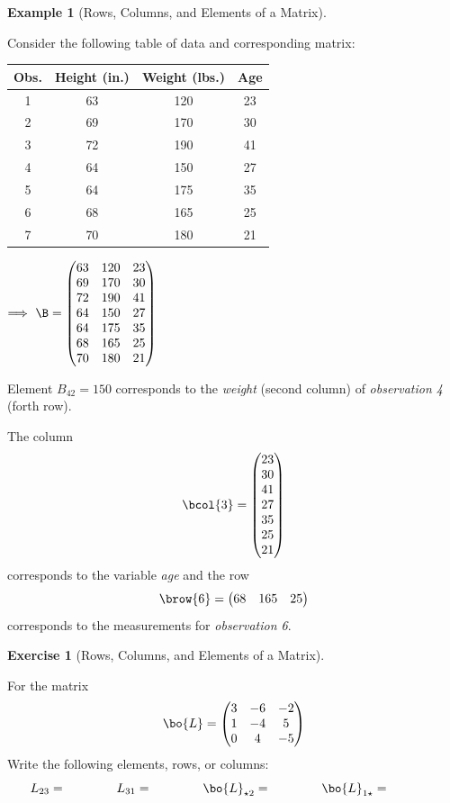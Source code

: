 \documentclass[
]{article}
\theoremstyle{definition}
\theoremstyle{definition}
\newtheorem{example}{Example}[section]
\theoremstyle{definition}
\newtheorem{exercise}{Exercise}[section]
\theoremstyle{definition}
\theoremstyle{remark}
\begin{document}
\begin{example}[Rows, Columns, and Elements of a Matrix]
\protect\hypertarget{exm:ijnot}{}\label{exm:ijnot}

Consider the following table of data and corresponding matrix:

\begin{center}
\begin{tabular}{c|c|c|c}
Obs. & Height (in.) & Weight (lbs.) & Age \\
\hline
1 & 63 & 120 & 23\\
2 & 69 & 170 & 30\\
3 & 72 & 190 & 41\\
4 & 64 & 150 & 27\\
5 & 64 & 175 & 35\\
6 & 68 & 165 & 25\\
7 & 70 & 180 & 21
\end{tabular} $\Longrightarrow \,\, \B=\left(\begin{matrix}63 & 120 & 23\\
69 & 170 & 30\\
72 & 190 & 41\\
64 & 150 & 27\\
64 & 175 & 35\\
68 & 165 & 25\\
70 & 180 & 21\end{matrix}\right)$
\end{center}

Element \(B_{42}=150\) corresponds to the \emph{weight} (second column) of \emph{observation 4} (forth row).

The column \[\bcol{3} = \left(\begin{matrix} 23\\30\\41\\27\\35\\25\\21 \end{matrix}\right)\] corresponds to the variable \emph{age} and the row \[\brow{6} = \left(\begin{matrix} 68&165&25 \end{matrix}\right)\] corresponds to the measurements for \emph{observation 6}.

\end{example}

\begin{exercise}[Rows, Columns, and Elements of a Matrix]
\protect\hypertarget{exr:ijnot}{}\label{exr:ijnot}

For the matrix
\[ \bo{L}=\left(\begin{matrix} 3 & -6 & -2\\1 & -4 & 5\\0 & 4 & -5 \end{matrix}\right)\]
Write the following elements, rows, or columns:
\vspace{.5cm}
\[L_{23}= \qquad\qquad L_{31}= \qquad\qquad \bo{L}_{\star 2}= \qquad\qquad \bo{L}_{1 \star}=\qquad\qquad\]
\vspace{1cm}

\end{exercise}
\end{document}
